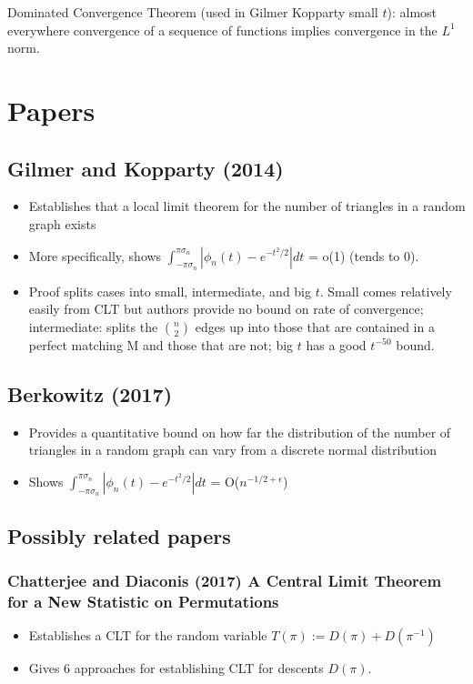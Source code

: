 \documentclass{article}
\newcommand{\abs}[1]{\left\lvert#1\right\rvert}
\theoremstyle{definition}
\theoremstyle{remark}
\begin{document}
Dominated Convergence Theorem (used in Gilmer Kopparty small $t$): almost everywhere convergence of a sequence of functions implies convergence in the $L^1$ norm.

\section{Papers}

\subsection*{Gilmer and Kopparty (2014)}
\begin{itemize}
\item Establishes that a local limit theorem for the number of triangles in a random graph exists
\item More specifically, shows $\int_{-\pi\sigma_n}^{\pi\sigma_n} \abs{\phi_n(t) - e^{-t^2/2}} dt$ = o(1) (tends to 0).
\item Proof splits cases into small, intermediate, and big $t$. Small comes relatively easily from CLT but authors provide no bound on rate of convergence; intermediate: splits the ${n}\choose{2}$ edges up into those that are contained in a perfect matching M and those that are not; big $t$ has a good $t^{-50}$ bound.
\end{itemize}

\subsection*{Berkowitz (2017)}
\begin{itemize}
\item Provides a quantitative bound on how far the distribution of the number of triangles in a random graph can vary from a discrete normal distribution
\item Shows $\int_{-\pi\sigma_n}^{\pi\sigma_n} \abs{\phi_n(t) - e^{-t^2/2}} dt$ = O($n^{-1/2+\epsilon}$) 
\end{itemize}


\subsection*{Possibly related papers}
\subsubsection{Chatterjee and Diaconis (2017) A Central Limit Theorem for a New Statistic on Permutations}
\begin{itemize}
\item Establishes a CLT for the random variable $T(\pi) := D(\pi) + D(\pi^{-1})$
\item Gives 6 approaches for establishing CLT for descents $D(\pi)$. 
\end{itemize}
\end{document}
